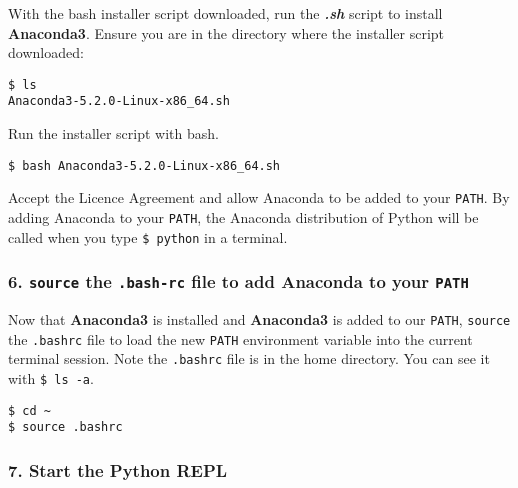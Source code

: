 \documentclass{book}
\newcommand{\passthrough}[1]{#1}
\begin{document}
With the bash installer script downloaded, run the \textbf{\emph{.sh}}
script to install \textbf{Anaconda3}. Ensure you are in the directory
where the installer script downloaded:

\begin{lstlisting}
$ ls
Anaconda3-5.2.0-Linux-x86_64.sh
\end{lstlisting}

Run the installer script with bash.

\begin{lstlisting}
$ bash Anaconda3-5.2.0-Linux-x86_64.sh
\end{lstlisting}

Accept the Licence Agreement and allow Anaconda to be added to your
\passthrough{\lstinline!PATH!}. By adding Anaconda to your
\passthrough{\lstinline!PATH!}, the Anaconda distribution of Python will
be called when you type \passthrough{\lstinline!$ python!} in a
terminal.
    




    
        \hypertarget{source-the-.bash-rc-file-to-add-anaconda-to-your-path}{%
\subsubsection{\texorpdfstring{6. \texttt{source} the \texttt{.bash-rc}
file to add Anaconda to your
\texttt{PATH}}{6. source the .bash-rc file to add Anaconda to your PATH}}\label{source-the-.bash-rc-file-to-add-anaconda-to-your-path}}

Now that \textbf{Anaconda3} is installed and \textbf{Anaconda3} is added
to our \passthrough{\lstinline!PATH!}, \passthrough{\lstinline!source!}
the \passthrough{\lstinline!.bashrc!} file to load the new
\passthrough{\lstinline!PATH!} environment variable into the current
terminal session. Note the \passthrough{\lstinline!.bashrc!} file is in
the home directory. You can see it with
\passthrough{\lstinline!$ ls -a!}.

\begin{lstlisting}
$ cd ~
$ source .bashrc
\end{lstlisting}
    




    
        \hypertarget{start-the-python-repl}{%
\subsubsection{7. Start the Python REPL}\label{start-the-python-repl}}
\end{document}
